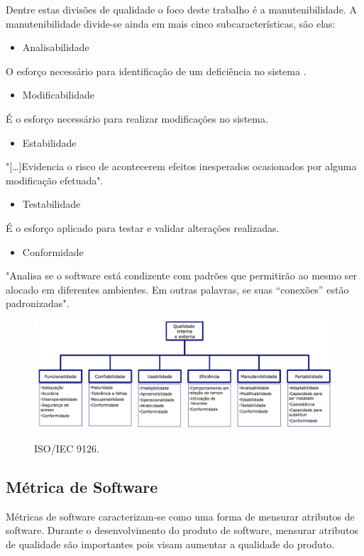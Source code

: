 Dentre estas divisões de qualidade o foco deste trabalho é a manutenibilidade. A manutenibilidade divide-se ainda em mais cinco subcaracterísticas, são elas:
\begin{itemize}
\item Analisabilidade
\end{itemize}
O esforço necessário para identificação de um deficiência no sistema \cite{isaias2012}.
\begin{itemize}
\item Modificabilidade
\end{itemize}
É o esforço necessário para realizar modificações no sistema.
\begin{itemize}
\item Estabilidade
\end{itemize}
"[\ldots]Evidencia  o  risco  de  acontecerem  efeitos inesperados ocasionados por alguma modificação efetuada"\space \cite[p.~29]{isaias2012}.
\begin{itemize}
\item Testabilidade
\end{itemize}
É o esforço aplicado para testar e validar alterações realizadas.
\begin{itemize}
\item Conformidade
\end{itemize}
"Analisa  se  o  software  está  condizente  com 
padrões  que  permitirão  ao  mesmo  ser  alocado  em  diferentes ambientes.  Em  outras  palavras,  se  suas  “conexões”  estão padronizadas"\space \cite[p.~29]{isaias2012}.
\begin{figure}[h]
\centering
\caption[ISO/IEC 9126]{ISO/IEC 9126.}
\includegraphics[width=0.7\linewidth]{./images/iso9126}
\label{fig:ISO9126}
\end{figure}


\subsection{Métrica de Software}
Métricas de software caracterizam-se como uma forma de mensurar atributos de software. Durante o desenvolvimento do produto de software, mensurar atributos de qualidade são importantes pois visam aumentar a qualidade do produto.

